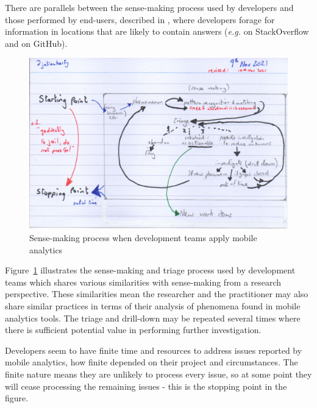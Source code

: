 There are parallels between the sense-making process used by developers and those performed by end-users, described in , where developers forage for information in locations that are likely to contain answers (\emph{e.g.} on StackOverflow and on GitHub).

\begin{figure}
    \centering
    \includegraphics[width=\linewidth]{images/rough-sketches/practical-sense-making-process-10-nov-2021.jpeg}
    \caption{Sense-making process when development teams apply mobile analytics}
    \label{fig:practical-sense-making-process-when-dev-teams-apply-mobile-analytics}
\end{figure}


Figure~\ref{fig:practical-sense-making-process-when-dev-teams-apply-mobile-analytics} illustrates the sense-making and triage process used by development teams which shares various similarities with sense-making from a research perspective. These similarities mean the researcher and the practitioner may also share similar practices in terms of their analysis of phenomena found in mobile analytics tools. The triage and drill-down may be repeated several times where there is sufficient potential value in performing further investigation.

Developers seem to have finite time and resources to address issues reported by mobile analytics, how finite depended on their project and circumstances. The finite nature means they are unlikely to process every issue, so at some point they will cease processing the remaining issues - this is the stopping point in the figure.

